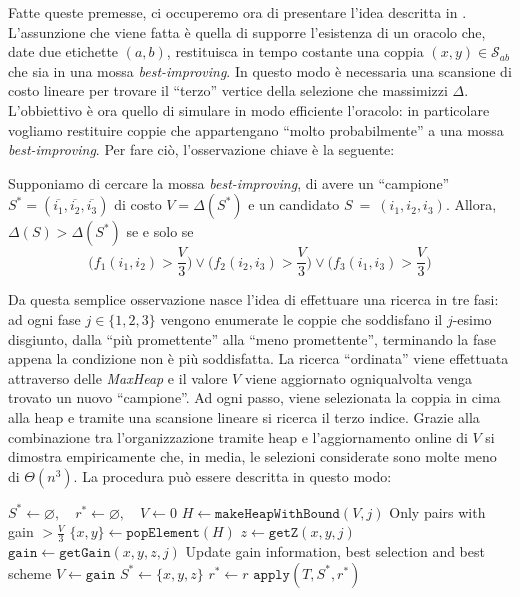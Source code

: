 Fatte queste premesse, ci occuperemo ora di presentare l'idea descritta in \cite{3opt}.
L'assunzione che viene fatta è quella di supporre l'esistenza di un oracolo che, date due etichette $(a,b)$,
restituisca in tempo costante una coppia $(x,y) \in \mathcal{S}_{ab}$ che sia in una mossa 
\textit{best-improving}. In questo modo è necessaria
una scansione di costo lineare per trovare il ``terzo'' vertice della selezione che massimizzi $\Delta$.
L'obbiettivo è ora quello di simulare in modo efficiente l'oracolo: in particolare vogliamo restituire coppie
che appartengano ``molto probabilmente'' a una mossa \textit{best-improving}. Per fare ciò, l'osservazione chiave
è la seguente:
\begin{observation}[]
    Supponiamo di cercare la mossa \textit{best-improving}, di avere un ``campione''\\
    $S^*=(\overline{i_1}, \overline{i_2}, \overline{i_3})$ di costo $V = \Delta(S^*)$ e un
    candidato $S~=~(i_1,i_2,i_3)$. Allora, $\Delta(S) > \Delta(S^*)$ se e solo se
    $$\Bigg(f_1(i_1,i_2) > \frac{V}{3}\Bigg) \vee \Bigg(f_2(i_2,i_3) > \frac{V}{3}\Bigg) \vee \Bigg(f_3(i_1,i_3) > \frac{V}{3}\Bigg)$$
\end{observation}

Da questa semplice osservazione nasce l'idea di effettuare una ricerca in tre fasi: ad ogni fase 
$j \in \{1,2,3\}$ vengono enumerate le coppie che soddisfano il $j$-esimo disgiunto, dalla ``più promettente''
alla ``meno promettente'', terminando la fase appena la condizione non è più soddisfatta. La ricerca ``ordinata''
viene effettuata attraverso delle \textit{MaxHeap} e il valore $V$ viene aggiornato ogniqualvolta venga trovato
un nuovo ``campione''. Ad ogni passo, viene selezionata la coppia in cima alla heap e tramite una scansione
lineare si ricerca il terzo indice. Grazie alla combinazione tra l'organizzazione tramite heap e l'aggiornamento
online di $V$ si dimostra empiricamente che, in media, le selezioni considerate sono molte meno di $\Theta(n^3)$.
La procedura può essere descritta in questo modo:

\begin{algorithm}[H]
\caption{}
\begin{algorithmic}[1]
    \State $S^* \gets \varnothing,\quad r^* \gets \varnothing,\quad V \gets 0$
            \State $H \gets \texttt{makeHeapWithBound}(V, j)$ \Comment Only pairs with gain $>\frac{V}{3}$
                \State $\{x,y\} \gets \texttt{popElement}(H)$
                \State $z \gets \texttt{getZ}(x,y,j)$
                \State $\texttt{gain} \gets \texttt{getGain}(x,y,z,j)$
                 \Comment Update gain information, best selection and best scheme
                    \State $V \gets \texttt{gain}$
                    \State $S^* \gets \{x,y,z\}$
                    \State $r^* \gets r$
                \EndIf
            \EndWhile
        \EndFor
    \EndFor
    \State $\texttt{apply}(T, S^*, r^*)$
\EndFunction
\end{algorithmic}
\end{algorithm}

